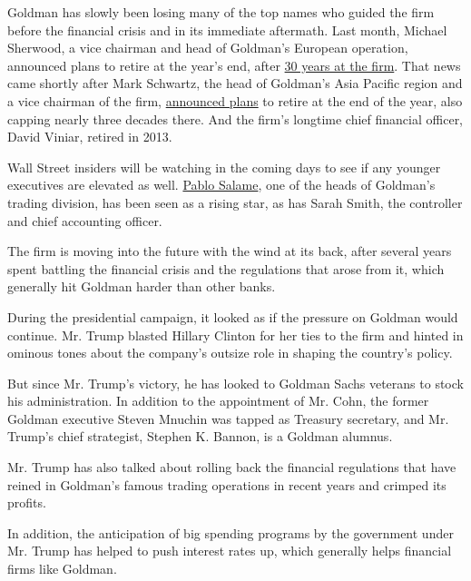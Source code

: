 Goldman has slowly been losing many of the top names who guided the firm
before the financial crisis and in its immediate aftermath. Last month,
Michael Sherwood, a vice chairman and head of Goldman's European
operation, announced plans to retire at the year's end, after
\href{https://www.nytimes3xbfgragh.onion/2016/11/21/business/dealbook/michael-sherwood-goldman-sachss-co-head-of-europe-to-step-down.html}{30
years at the firm}. That news came shortly after Mark Schwartz, the head
of Goldman's Asia Pacific region and a vice chairman of the firm,
\href{http://www.nytimes3xbfgragh.onion/2016/10/18/business/dealbook/goldman-sachss-asia-pacific-chairman-to-retire.html?rref=collection\%2Ftimestopic\%2FGoldman\%20Sachs\%20Group\&action=click\&contentCollection=business\&region=stream\&module=stream_unit\&version=latest\&contentPlacement=5\&pgtype=collection}{announced
plans} to retire at the end of the year, also capping nearly three
decades there. And the firm's longtime chief financial officer, David
Viniar, retired in 2013.

Wall Street insiders will be watching in the coming days to see if any
younger executives are elevated as well.
\href{http://www.goldmansachs.com/who-we-are/leadership/management-committee/pablo-j-salame.html}{Pablo
Salame}, one of the heads of Goldman's trading division, has been seen
as a rising star, as has Sarah Smith, the controller and chief
accounting officer.

The firm is moving into the future with the wind at its back, after
several years spent battling the financial crisis and the regulations
that arose from it, which generally hit Goldman harder than other banks.

During the presidential campaign, it looked as if the pressure on
Goldman would continue. Mr. Trump blasted Hillary Clinton for her ties
to the firm and hinted in ominous tones about the company's outsize role
in shaping the country's policy.

But since Mr. Trump's victory, he has looked to Goldman Sachs veterans
to stock his administration. In addition to the appointment of Mr. Cohn,
the former Goldman executive Steven Mnuchin was tapped as Treasury
secretary, and Mr. Trump's chief strategist, Stephen K. Bannon, is a
Goldman alumnus.

Mr. Trump has also talked about rolling back the financial regulations
that have reined in Goldman's famous trading operations in recent years
and crimped its profits.

In addition, the anticipation of big spending programs by the government
under Mr. Trump has helped to push interest rates up, which generally
helps financial firms like Goldman.


